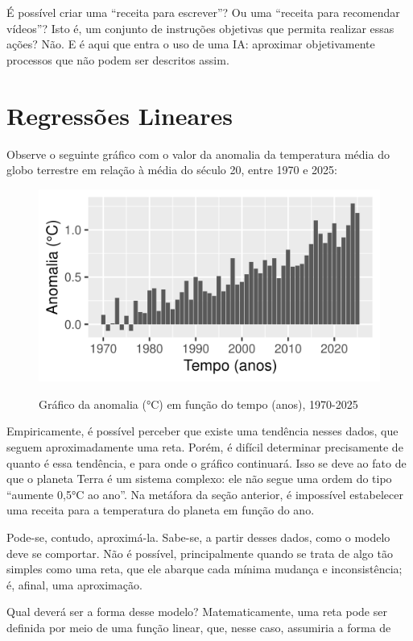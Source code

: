 É possível criar uma ``receita para escrever''?
Ou uma ``receita para recomendar vídeos''?
Isto é, um conjunto de instruções objetivas que permita realizar essas ações?
Não. 
E é aqui que entra o uso de uma IA: aproximar objetivamente processos que não podem ser descritos assim.

\section{Regressões Lineares}
Observe o seguinte gráfico com o valor da anomalia da temperatura média do globo terrestre em relação à média do século 20, entre 1970 e 2025:

\begin{figure}[H]
    \centering
    \caption{Gráfico da anomalia (°C) em função do tempo (anos), 1970-2025}
    \includegraphics[width=\linewidth]{static/R/plot/anom-1-hist.png}
    \label{fig:2:anom-1-hist}
\end{figure}

Empiricamente, é possível perceber que existe uma tendência nesses dados, que seguem aproximadamente uma reta.
Porém, é difícil determinar precisamente de quanto é essa tendência, e para onde o gráfico continuará. 
Isso se deve ao fato de que o planeta Terra é um sistema complexo: ele não segue uma ordem do tipo ``aumente 0,5°C ao ano''.
Na metáfora da seção anterior, é impossível estabelecer uma receita para a temperatura do planeta em função do ano.

Pode-se, contudo, aproximá-la.
Sabe-se, a partir desses dados, como o modelo deve se comportar.
Não é possível, principalmente quando se trata de algo tão simples como uma reta, que ele abarque cada mínima mudança e inconsistência; é, afinal, uma aproximação.

Qual deverá ser a forma desse modelo?
Matematicamente, uma reta pode ser definida por meio de uma função linear, que, nesse caso, assumiria a forma de

